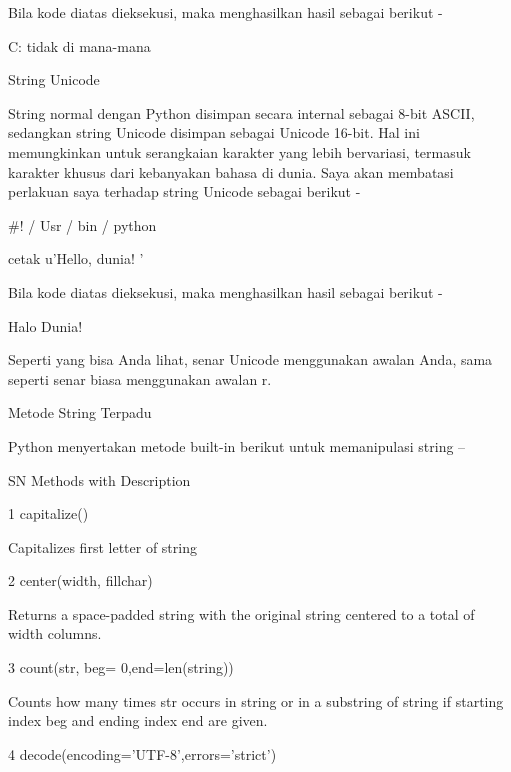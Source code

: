 Bila kode diatas dieksekusi, maka menghasilkan hasil sebagai berikut - \par
C: tidak di mana-mana \par
String Unicode \par
String normal dengan Python disimpan secara internal sebagai 8-bit ASCII, sedangkan string Unicode disimpan sebagai Unicode 16-bit. Hal ini memungkinkan untuk serangkaian karakter yang lebih bervariasi, termasuk karakter khusus dari kebanyakan bahasa di dunia. Saya akan membatasi perlakuan saya terhadap string Unicode sebagai berikut - \par
 $  \#  $! / Usr / bin / python \par
\vspace{12pt}
cetak u'Hello, dunia! ' \par
Bila kode diatas dieksekusi, maka menghasilkan hasil sebagai berikut - \par
Halo Dunia! \par
Seperti yang bisa Anda lihat, senar Unicode menggunakan awalan Anda, sama seperti senar biasa menggunakan awalan r. \par
Metode String Terpadu \par
Python menyertakan metode built-in berikut untuk memanipulasi string – \par
\vspace{12pt}
SN \hspace*{0.5in} Methods with Description \par
1 \hspace*{0.5in} capitalize() \par
Capitalizes first letter of string \par
2 \hspace*{0.5in} center(width, fillchar) \par
\vspace{12pt}
Returns a space-padded string with the original string centered to a total of width columns. \par
3 \hspace*{0.5in} count(str, beg= 0,end=len(string)) \par
\vspace{12pt}
Counts how many times str occurs in string or in a substring of string if starting index beg and ending index end are given. \par
4 \hspace*{0.5in} decode(encoding='UTF-8',errors='strict') \par
\vspace{12pt}
